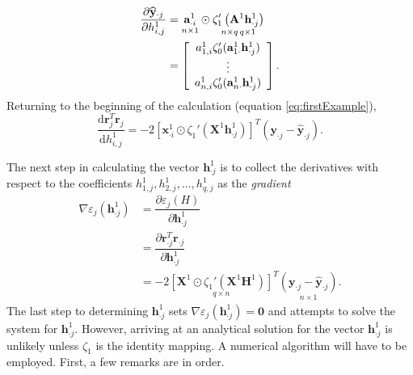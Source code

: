 \documentclass[graybox,envcountchap]{svmono}
\newcommand{\Xf}{\mathbf{X}}
\newcommand{\hf}{\mathbf{h}}
\newcommand{\Hf}{\mathbf{H}}
\newcommand{\xf}{\mathbf{x}}
\newcommand{\yf}{\mathbf{y}}
\newcommand{\w}{\widehat}
\begin{document}
\begin{equation}
 \begin{align}
 {\dfrac{\partial \w{\yf}_{\cdot j}}{\partial h^1_{i,j}}}&= \underset{n \times 1} {\mathbf{a}^1_{\cdot i }}\odot \underset{n \times q \hspace{.02 in}q \times 1}{ \zeta_1'\left( {\mathbf{A}^1}{\hf_{\cdot j}^1 } \right)}\\
 &= \left[
  \begin{array}{c}
   a^1_{1,i}\zeta_0'(\mathbf{a}^1_{1 \cdot}\hf^1_{\cdot j})\\
   \vdots \\
   a^1_{n ,i}\zeta_0'(\mathbf{a}^1_{n \cdot}\hf^1_{\cdot j})
  \end{array}\right].
 \end{align}
\end{equation}
Returning to the beginning of the calculation (equation \ref{eq:firstExample}),
\begin{equation}\label{eq:dr}
\dfrac{\text{d}\mathbf{r}_j^T\mathbf{r}_j}{ \text{d} h^1_{i, j}}  = -2\left[ {\xf^1_{\cdot i }\odot { \zeta_1'\left( {\Xf^1}{\hf_{\cdot j}^1} \right)}}\right]^T{(\yf_{\cdot j } -\w{\yf}_{\cdot j } )}.
\end{equation}

The next step in calculating the vector $\hf^1_{\cdot j}$ is to collect the derivatives with respect to the coefficients $h^1_{1,j}, h^1_{2,j}, \ldots, h^1_{q,j}$ as the \emph{gradient}
\begin{equation}\label{eq:firstGrad}
\begin{align}
  \nabla \varepsilon_j(\hf_{\cdot j}^1) &= \dfrac{\partial \varepsilon_j(H)}{\partial \hf_{\cdot j}^1} \\
  &= \dfrac{\partial\mathbf{r}_{\cdot j}^T \mathbf{r}_{\cdot j}}{\partial \hf_{\cdot j}^1}\\
  &= -2\underset{q \times n}{\left[ {\Xf^1\odot { \zeta_1'\left( {\Xf^1}{\Hf^1} \right)}}\right]}^T
  \underset{n \times 1}{(\yf_{\cdot j } -\w{\yf}_{\cdot j } )}.
\end{align}
\end{equation}
The last step to determining $\hf^1_{\cdot j}$ sets $\nabla \varepsilon_j(\hf_{\cdot j}^1) = \mathbf{0}$ and attempts to solve the system for $\hf^1_{\cdot j}$. 
However, arriving at an analytical solution for the vector $\hf^1_{\cdot j}$ is unlikely unless $\zeta_1$ is the identity mapping. A numerical algorithm will have to be employed. First, a few remarks are in order.
\end{document}
